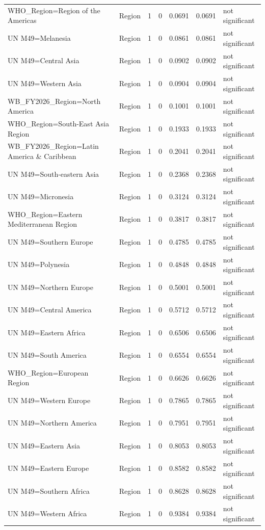 \documentclass[runningheads]{llncs}
\begin{document}
{\begin{longtable}{p{}p{}rr@{\hspace{0.7em}}rrp{}}
WHO\_Region=Region of the Americas & Region & 1 & 0 & 0.0691 & 0.0691 & not significant \\
UN M49=Melanesia & Region & 1 & 0 & 0.0861 & 0.0861 & not significant \\
UN M49=Central Asia & Region & 1 & 0 & 0.0902 & 0.0902 & not significant \\
UN M49=Western Asia & Region & 1 & 0 & 0.0904 & 0.0904 & not significant \\
WB\_FY2026\_Region=North America & Region & 1 & 0 & 0.1001 & 0.1001 & not significant \\
WHO\_Region=South-East Asia Region & Region & 1 & 0 & 0.1933 & 0.1933 & not significant \\
\shortstack[l]{WB\_FY2026\_Region=Latin\\ America \& Caribbean} & Region & 1 & 0 & 0.2041 & 0.2041 & not significant \\
UN M49=South-eastern Asia & Region & 1 & 0 & 0.2368 & 0.2368 & not significant \\
UN M49=Micronesia & Region & 1 & 0 & 0.3124 & 0.3124 & not significant \\
WHO\_Region=Eastern Mediterranean Region & Region & 1 & 0 & 0.3817 & 0.3817 & not significant \\
UN M49=Southern Europe & Region & 1 & 0 & 0.4785 & 0.4785 & not significant \\
UN M49=Polynesia & Region & 1 & 0 & 0.4848 & 0.4848 & not significant \\
UN M49=Northern Europe & Region & 1 & 0 & 0.5001 & 0.5001 & not significant \\
UN M49=Central America & Region & 1 & 0 & 0.5712 & 0.5712 & not significant \\
UN M49=Eastern Africa & Region & 1 & 0 & 0.6506 & 0.6506 & not significant \\
UN M49=South America & Region & 1 & 0 & 0.6554 & 0.6554 & not significant \\
WHO\_Region=European Region & Region & 1 & 0 & 0.6626 & 0.6626 & not significant \\
UN M49=Western Europe & Region & 1 & 0 & 0.7865 & 0.7865 & not significant \\
UN M49=Northern America & Region & 1 & 0 & 0.7951 & 0.7951 & not significant \\
UN M49=Eastern Asia & Region & 1 & 0 & 0.8053 & 0.8053 & not significant \\
UN M49=Eastern Europe & Region & 1 & 0 & 0.8582 & 0.8582 & not significant \\
UN M49=Southern Africa & Region & 1 & 0 & 0.8628 & 0.8628 & not significant \\
UN M49=Western Africa & Region & 1 & 0 & 0.9384 & 0.9384 & not significant \\
\hline
\end{longtable}
}
\end{document}
